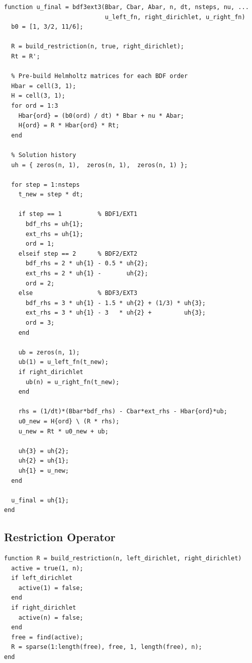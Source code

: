 \documentclass[11pt]{article}
\begin{document}
\begin{lstlisting}[caption={BDF3/EXT3 unsteady solver with boundary lifting.}]
function u_final = bdf3ext3(Bbar, Cbar, Abar, n, dt, nsteps, nu, ...
                            u_left_fn, right_dirichlet, u_right_fn)
  b0 = [1, 3/2, 11/6];

  R = build_restriction(n, true, right_dirichlet);
  Rt = R';

  % Pre-build Helmholtz matrices for each BDF order
  Hbar = cell(3, 1);
  H = cell(3, 1);
  for ord = 1:3
    Hbar{ord} = (b0(ord) / dt) * Bbar + nu * Abar;
    H{ord} = R * Hbar{ord} * Rt;
  end

  % Solution history
  uh = { zeros(n, 1),  zeros(n, 1),  zeros(n, 1) };

  for step = 1:nsteps
    t_new = step * dt;

    if step == 1          % BDF1/EXT1
      bdf_rhs = uh{1};
      ext_rhs = uh{1};
      ord = 1;
    elseif step == 2      % BDF2/EXT2
      bdf_rhs = 2 * uh{1} - 0.5 * uh{2};
      ext_rhs = 2 * uh{1} -       uh{2};
      ord = 2;
    else                  % BDF3/EXT3
      bdf_rhs = 3 * uh{1} - 1.5 * uh{2} + (1/3) * uh{3};
      ext_rhs = 3 * uh{1} - 3   * uh{2} +         uh{3};
      ord = 3;
    end

    ub = zeros(n, 1);
    ub(1) = u_left_fn(t_new);
    if right_dirichlet
      ub(n) = u_right_fn(t_new);
    end

    rhs = (1/dt)*(Bbar*bdf_rhs) - Cbar*ext_rhs - Hbar{ord}*ub;
    u0_new = H{ord} \ (R * rhs);
    u_new = Rt * u0_new + ub;

    uh{3} = uh{2};
    uh{2} = uh{1};
    uh{1} = u_new;
  end

  u_final = uh{1};
end
\end{lstlisting}

\subsection{Restriction Operator}

\begin{lstlisting}[caption={Boundary restriction operator.}]
function R = build_restriction(n, left_dirichlet, right_dirichlet)
  active = true(1, n);
  if left_dirichlet
    active(1) = false;
  end
  if right_dirichlet
    active(n) = false;
  end
  free = find(active);
  R = sparse(1:length(free), free, 1, length(free), n);
end
\end{lstlisting}


\end{document}
